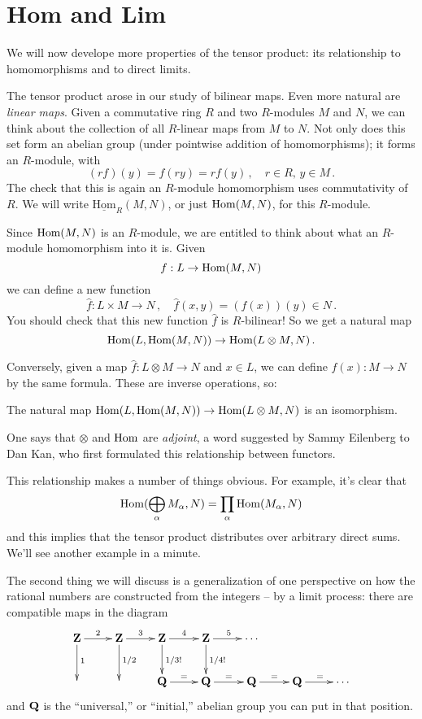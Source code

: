 \section{Hom and Lim}\label{limits}

We will now develope more properties of the tensor product: its relationship to
homomorphisms and to direct limits. 

The tensor product arose in our study of bilinear maps. Even more natural are
{\em linear maps}. Given a commutative ring $R$ and two $R$-modules $M$ and 
$N$, we can think about the collection of all $R$-linear maps from $M$ to $N$.
Not only does this set form an abelian group (under pointwise addition of 
homomorphisms); it forms an $R$-module, with
\[
(rf)(y)=f(ry)=rf(y)\,,\quad r\in R,\, y\in M\,.
\]
The check that this is again an $R$-module homomorphism uses commutativity of
$R$. We will write $\underline{\mathrm{Hom}}_R(M,N)$, or just $\operatorname{Hom}(M,N)$, 
for this $R$-module. 

Since $\operatorname{Hom}(M,N)$ is an $R$-module, we are entitled to think about what 
an $R$-module homomorphism into it is. Given 
\[
f:L\to\operatorname{Hom}(M,N)
\]
we can define a new function 
\[
\hat f:L\times M\to N\,,\quad \hat f(x,y)=(f(x))(y)\in N\,.
\]
You should check that this new function $\hat f$ is $R$-bilinear! So we get 
a natural map
\[
\operatorname{Hom}(L,\operatorname{Hom}(M,N))\to\operatorname{Hom}(L\otimes M,N)\,.
\]

Conversely, given a map $\hat f:L\otimes M\to N$ and $x\in L$, we can define
$f(x):M\to N$ by the same formula. These are inverse operations, so:
\begin{lemma}
The natural map $\operatorname{Hom}(L,\operatorname{Hom}(M,N))\to\operatorname{Hom}(L\otimes M,N)$ is an isomorphism.
\end{lemma}

One says that $\otimes$ and $\operatorname{Hom}$ are {\em adjoint}, a word suggested by 
Sammy Eilenberg to Dan Kan, who first formulated this relationship between
functors. 

This relationship makes a number of things obvious. For example, it's clear 
that 
\[
\operatorname{Hom}(\bigoplus_\alpha M_\alpha,N)=\prod_\alpha\operatorname{Hom}(M_\alpha,N)
\]
and this implies that the tensor product distributes over arbitrary
direct sums. We'll see another example in a minute. 

The second thing we will discuss is a generalization of one perspective on
how the rational numbers are constructed from the integers -- by a limit 
process: there are compatible maps in the diagram 
\[
\xymatrix{
\Z \ar[r]^2 \ar[d]^1 & \Z \ar[r]^3 \ar[d]^{1/2} & \Z \ar[r]^4 \ar[d]^{1/3!}
& \Z \ar[r]^5 \ar[d]^{1/4!} & \cdots \\
&& \QQ \ar[r]^= & \QQ \ar[r]^= & \QQ \ar[r]^= & \QQ \ar[r]^= & \cdots
}\]
and $\mathbf Q$ is the ``universal,'' or ``initial,'' abelian group you can put
in that position. 

